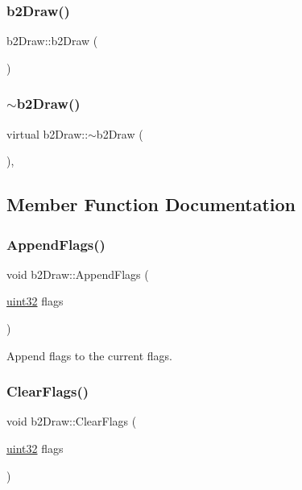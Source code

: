 \subsubsection{\texorpdfstring{b2Draw()}{b2Draw()}}
{\footnotesize\ttfamily b2\+Draw\+::b2\+Draw (\begin{DoxyParamCaption}{ }\end{DoxyParamCaption})}

\mbox{\label{classb2_draw_ad5003ecc3b483f4e008422a0fe8b20ad}} 
\subsubsection{\texorpdfstring{$\sim$b2Draw()}{~b2Draw()}}
{\footnotesize\ttfamily virtual b2\+Draw\+::$\sim$b2\+Draw (\begin{DoxyParamCaption}{ }\end{DoxyParamCaption})\hspace{0.3cm}{\ttfamily [inline]}, {\ttfamily [virtual]}}



\subsection{Member Function Documentation}
\mbox{\label{classb2_draw_acc2fd4648ee0a65574770c64528f7166}} 
\subsubsection{\texorpdfstring{AppendFlags()}{AppendFlags()}}
{\footnotesize\ttfamily void b2\+Draw\+::\+Append\+Flags (\begin{DoxyParamCaption}\item[{\mbox{\hyperlink{b2_settings_8h_a1134b580f8da4de94ca6b1de4d37975e}{uint32}}}]{flags }\end{DoxyParamCaption})}



Append flags to the current flags. 

\mbox{\label{classb2_draw_afc240b71f4ba8c17440d6ed526d4e22e}} 
\subsubsection{\texorpdfstring{ClearFlags()}{ClearFlags()}}
{\footnotesize\ttfamily void b2\+Draw\+::\+Clear\+Flags (\begin{DoxyParamCaption}\item[{\mbox{\hyperlink{b2_settings_8h_a1134b580f8da4de94ca6b1de4d37975e}{uint32}}}]{flags }\end{DoxyParamCaption})}




